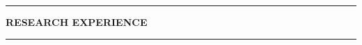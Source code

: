 \documentclass[letterpaper,9pt]{article}
\begin{document}
\vspace{0.2em}



\noindent
\begin{center}
    \rule[0.5ex]{0.34\linewidth}{0.5pt}
    \hspace{0.5em}
    \textbf{RESEARCH EXPERIENCE}
    \hspace{0.5em}
    \rule[0.5ex]{0.34\linewidth}{0.5pt}   
    \vspace{0.3em}
\end{center}

\begin{itemize}[leftmargin=0pt, parsep=0pt, itemsep=0.4em]




\end{itemize}
\end{document}
